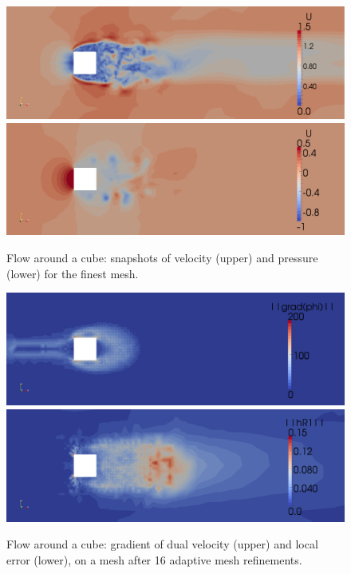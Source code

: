\begin{figure}
  \centering
  \includegraphics[width=\largefig]{chapters/hoffman-1/png/fig2b.png}
  \medskip
  \includegraphics[width=\largefig]{chapters/hoffman-1/png/fig2c.png}
  \caption{Flow around a cube: snapshots of velocity (upper) and pressure
    (lower) for the finest mesh.}
  \label{hoffman-1:fig:cube2}
\end{figure}

\begin{figure}
  \centering
  \includegraphics[width=\largefig]{chapters/hoffman-1/png/fig3a.png}
  \medskip
  \includegraphics[width=\largefig]{chapters/hoffman-1/png/fig3b.png}
  \caption{Flow around a cube: gradient of dual velocity (upper) and local
    error (lower), on a mesh after 16 adaptive mesh refinements.}
  \label{hoffman-1:fig:cube3}
\end{figure}


